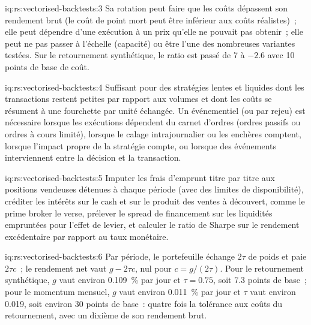 \begin{solution}{iq:rs:vectorised-backtests:3}
Sa rotation peut faire que les coûts dépassent son rendement brut (le coût de point mort peut être inférieur aux coûts réalistes)~; elle peut dépendre d'une exécution à un prix
qu'elle ne pouvait pas obtenir~; elle peut ne pas passer à l'échelle (capacité) ou être l'une des nombreuses variantes testées. Sur le retournement synthétique, le ratio est passé de 7 à $-2.6$ avec 10 points de base de coût.
\end{solution}

\begin{solution}{iq:rs:vectorised-backtests:4}
Suffisant pour des stratégies lentes et liquides dont les transactions restent petites par rapport aux volumes et dont les coûts se résument à une fourchette par unité échangée. Un  événementiel (ou par rejeu) est
nécessaire lorsque les exécutions dépendent du carnet d'ordres (ordres passifs ou ordres à cours limité), lorsque le calage intrajournalier ou les enchères comptent, lorsque l'impact propre de la stratégie compte,
ou lorsque des événements interviennent entre la décision et la transaction.
\end{solution}

\begin{solution}{iq:rs:vectorised-backtests:5}
Imputer les frais d'emprunt titre par titre aux positions vendeuses détenues à chaque période (avec des limites de disponibilité), créditer les intérêts sur le cash et sur le produit des ventes à découvert, comme le prime broker
le verse, prélever le spread de financement sur les liquidités empruntées pour l'effet de levier, et calculer le ratio de Sharpe sur le rendement excédentaire par rapport au taux monétaire.
\end{solution}

\begin{solution}{iq:rs:vectorised-backtests:6}
Par période, le portefeuille échange $2\tau$ de poids et paie $2\tau c$~; le rendement net vaut $g - 2\tau c$, nul pour $c = g/(2\tau)$. Pour le retournement synthétique, $g$ vaut environ
0.109~\% par jour et $\tau = 0.75$, soit 7.3 points de base~; pour le momentum mensuel, $g$ vaut environ 0.011~\% par jour et $\tau$ vaut environ 0.019, soit environ 30 points de base~: quatre fois la
tolérance aux coûts du retournement, avec un dixième de son rendement brut.
\end{solution}
